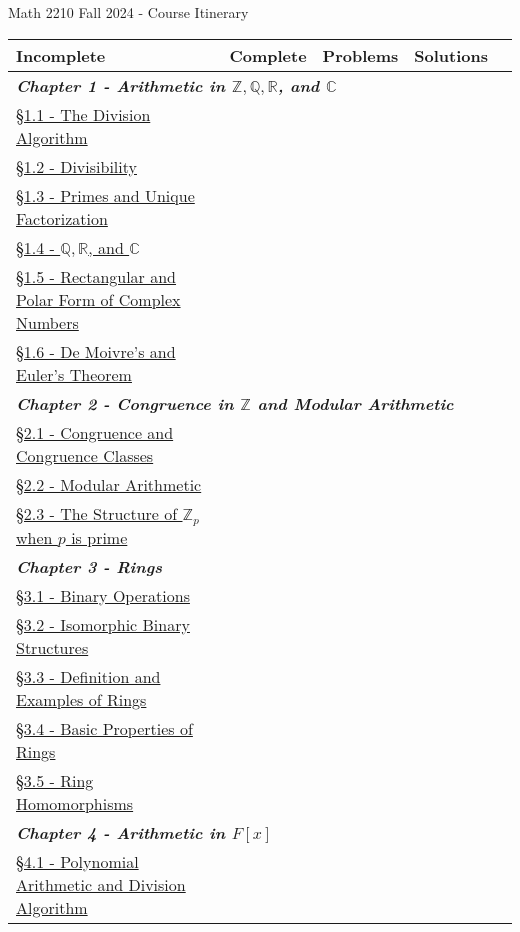 \documentclass{article}
\newcommand{\chaptercolor}{RoyalBlue!35}
\begin{document}
\large
\begin{center}
{\Huge Math 2210 Fall 2024 - Course Itinerary}
\vspace{0.25cm}

\begin{tabular}{|l|l|l|l|l|}
\cellcolor{black!85}\color{white}Incomplete & \cellcolor{black!85}\color{white}Complete & \cellcolor{black!85}\color{white}Problems & \cellcolor{black!85}\color{white}Solutions\\
%
\hline
%
\multicolumn{4}{|l|}{\cellcolor{\chaptercolor} \textit{\textbf{Chapter 1 - Arithmetic in $\mathbb{Z}, \mathbb{Q}, \mathbb{R}$, and $\mathbb{C}$}}}\\
\hline
\href{}{\S1.1 - The Division Algorithm} & & & \\
\href{}{\S1.2 - Divisibility} & & & \\
\href{}{\S1.3 - Primes and Unique Factorization} & & & \\
\href{}{\S1.4 - $\mathbb{Q}, \mathbb{R}$, and $\mathbb{C}$} & & & \\
\href{}{\S1.5 - Rectangular and Polar Form of Complex Numbers} & & & \\
\href{}{\S1.6 - De Moivre's and Euler's Theorem} & & & \\
\hline
\multicolumn{4}{|l|}{\cellcolor{\chaptercolor} \textit{\textbf{Chapter 2 - Congruence in $\mathbb{Z}$ and Modular Arithmetic}}}\\
\hline
\href{}{\S2.1 - Congruence and Congruence Classes} & & & \\
\href{}{\S2.2 - Modular Arithmetic} & & & \\
\href{}{\S2.3 - The Structure of $\mathbb{Z}_{p}$ when $p$ is prime} & & & \\
\hline
\multicolumn{4}{|l|}{\cellcolor{\chaptercolor} \textit{\textbf{Chapter 3 - Rings}}}\\
\hline
\href{}{\S3.1 - Binary Operations} & & & \\
\href{}{\S3.2 - Isomorphic Binary Structures} & & & \\
\href{}{\S3.3 - Definition and Examples of Rings} & & & \\
\href{}{\S3.4 - Basic Properties of Rings} & & & \\
\href{}{\S3.5 - Ring Homomorphisms} & & & \\
\hline
\multicolumn{4}{|l|}{\cellcolor{\chaptercolor} \textit{\textbf{Chapter 4 - Arithmetic in $F[x]$}}}\\
\hline
\href{}{\S4.1 - Polynomial Arithmetic and Division Algorithm} & & & \\

\end{tabular}
\end{center}
\end{document}
